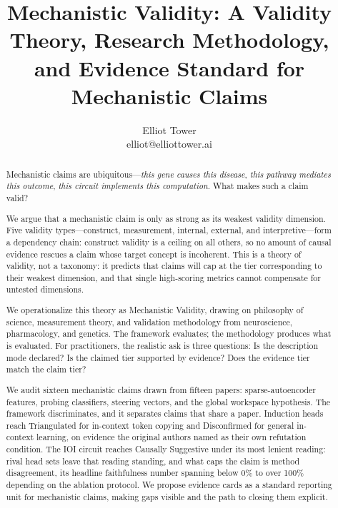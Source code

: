 \documentclass{article}
\title{Mechanistic Validity: A Validity Theory, Research Methodology, and Evidence Standard for Mechanistic Claims}
\author{\name Elliot Tower \\
      \email elliot@elliottower.ai}
\begin{document}
\maketitle

\begin{abstract}
Mechanistic claims are ubiquitous---\emph{this gene causes this disease}, \emph{this pathway mediates this outcome}, \emph{this circuit implements this computation}. What makes such a claim valid?

We argue that a mechanistic claim is only as strong as its weakest validity dimension. Five validity types---construct, measurement, internal, external, and interpretive---form a dependency chain: construct validity is a ceiling on all others, so no amount of causal evidence rescues a claim whose target concept is incoherent. This is a theory of validity, not a taxonomy: it predicts that claims will cap at the tier corresponding to their weakest dimension, and that single high-scoring metrics cannot compensate for untested dimensions.

We operationalize this theory as Mechanistic Validity, drawing on philosophy of science, measurement theory, and validation methodology from neuroscience, pharmacology, and genetics. The framework evaluates; the methodology produces what is evaluated. For practitioners, the realistic ask is three questions: Is the description mode declared? Is the claimed tier supported by evidence? Does the evidence tier match the claim tier?

We audit sixteen mechanistic claims drawn from fifteen papers: sparse-autoencoder features, probing classifiers, steering vectors, and the global workspace hypothesis. The framework discriminates, and it separates claims that share a paper. Induction heads reach Triangulated for in-context token copying and Disconfirmed for general in-context learning, on evidence the original authors named as their own refutation condition. The IOI circuit reaches Causally Suggestive under its most lenient reading: rival head sets leave that reading standing, and what caps the claim is method disagreement, its headline faithfulness number spanning below 0\% to over 100\% depending on the ablation protocol. We propose evidence cards as a standard reporting unit for mechanistic claims, making gaps visible and the path to closing them explicit.
\end{abstract}

\newpage
{\small\setlength{\parskip}{0pt}\setcounter{tocdepth}{3}\tableofcontents}
\newpage
\end{document}
